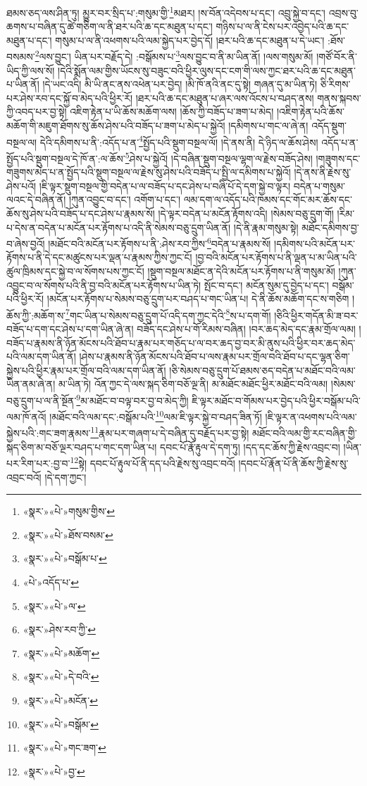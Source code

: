 ཐམས་ཅད་ལས་ཤིན་ཏུ། མྱུར་བར་སྲིད་པ་:གསུམ་གྱི་\footnote{«སྣར་»«པེ་»གསུམ་གྱིས་}མཐར། །ས་བོན་འདེབས་པ་དང་། འབྲུ་སྐྱེ་བ་དང་། འབྲས་བུ་ཆགས་པ་བཞིན་དུ་ཚེ་གཅིག་ལ་ནི་ཐར་པའི་ཆ་དང་མཐུན་པ་དང་། གཉིས་པ་ལ་ནི་ངེས་པར་འབྱེད་པའི་ཆ་དང་མཐུན་པ་དང་། གསུམ་པ་ལ་ནི་འཕགས་པའི་ལམ་སྐྱེད་པར་བྱེད་དོ། །ཐར་པའི་ཆ་དང་མཐུན་པ་དེ་ཡང་། :ཐོས་བསམས་\footnote{«སྣར་»«པེ་»ཐོས་བསམ་}ལས་བྱུང་། ཡིན་པར་བརྗོད་དེ། :བསྒོམས་པ་\footnote{«སྣར་»«པེ་»བསྒོམ་པ་}ལས་བྱུང་བ་ནི་མ་ཡིན་ནོ། །ལས་གསུམ་མོ། །གཙོ་བོར་ནི་ཡིད་ཀྱི་ལས་སོ། །དེའི་སྨོན་ལམ་གྱིས་ཡོངས་སུ་བཟུང་བའི་ཕྱིར་ལུས་དང་ངག་གི་ལས་ཀྱང་ཐར་པའི་ཆ་དང་མཐུན་པ་ཡིན་ནོ། །དེ་ཡང་འདི། མི་ཡི་ནང་ནས་འཕེན་པར་བྱེད། །མི་ཁོ་ནའི་ནང་དུ་སྟེ། གཞན་དུ་མ་ཡིན་ཏེ། ཅི་རིགས་པར་ཤེས་རབ་དང་སྐྱོ་བ་མེད་པའི་ཕྱིར་རོ། །ཐར་པའི་ཆ་དང་མཐུན་པ་ཞར་ལས་འོངས་པ་བཤད་ནས། གནས་སྐབས་ཀྱི་འབད་པར་བྱ་སྟེ། འཇིག་རྟེན་པ་ཡི་ཆོས་མཆོག་ལས། །ཆོས་ཀྱི་བཟོད་པ་ཟག་པ་མེད། །འཇིག་རྟེན་པའི་ཆོས་མཆོག་གི་མཇུག་ཐོགས་སུ་ཆོས་ཤེས་པའི་བཟོད་པ་ཟག་པ་མེད་པ་སྐྱེའོ། །དམིགས་པ་གང་ལ་ཞེ་ན། འདོད་སྡུག་བསྔལ་ལ། དེའི་དམིགས་པ་ནི་:འདོད་པ་ན་\footnote{«པེ་»འདོད་པ་}སྤྱོད་པའི་སྡུག་བསྔལ་ལོ། །དེ་ནས་ནི། དེ་ཉིད་ལ་ཆོས་ཤེས། འདོད་པ་ན་སྤྱོད་པའི་སྡུག་བསྔལ་དེ་ཁོ་ན་:ལ་ཆོས་\footnote{«སྣར་»«པེ་»ལ་}ཤེས་པ་སྐྱེའོ། །དེ་བཞིན་སྡུག་བསྔལ་ལྷག་ལ་རྗེས་བཟོད་ཤེས། །གཟུགས་དང་གཟུགས་མེད་པ་ན་སྤྱོད་པའི་སྡུག་བསྔལ་ལ་རྗེས་སུ་ཤེས་པའི་བཟོད་པ་སྤྱི་ལ་དམིགས་པ་སྐྱེའོ། །དེ་ནས་ནི་རྗེས་སུ་ཤེས་པའོ། །ཇི་ལྟར་སྡུག་བསྔལ་གྱི་བདེན་པ་ལ་བཟོད་པ་དང་ཤེས་པ་བཞི་པོ་དེ་དག་སྐྱེ་བ་ལྟར། བདེན་པ་གསུམ་ལའང་དེ་བཞིན་ནོ། །ཀུན་འབྱུང་བ་དང་། འགོག་པ་དང་། ལམ་དག་ལ་འདོད་པའི་ཁམས་དང་གོང་མར་ཆོས་དང་ཆོས་སུ་ཤེས་པའི་བཟོད་པ་དང་ཤེས་པ་རྣམས་སོ། །དེ་ལྟར་བདེན་པ་མངོན་རྟོགས་འདི། །སེམས་བཅུ་དྲུག་གོ། །རིམ་པ་དེས་ན་བདེན་པ་མངོན་པར་རྟོགས་པ་འདི་ནི་སེམས་བཅུ་དྲུག་ཡིན་ནོ། །དེ་ནི་རྣམ་གསུམ་སྟེ། མཐོང་དམིགས་བྱ་བ་ཞེས་བྱའོ། །མཐོང་བའི་མངོན་པར་རྟོགས་པ་ནི་:ཤེས་རབ་ཀྱིས་\footnote{«སྣར་»ཤེས་རབ་ཀྱི་}བདེན་པ་རྣམས་སོ། །དམིགས་པའི་མངོན་པར་རྟོགས་པ་ནི་དེ་དང་མཚུངས་པར་ལྡན་པ་རྣམས་ཀྱིས་ཀྱང་ངོ། །བྱ་བའི་མངོན་པར་རྟོགས་པ་ནི་ལྡན་པ་མ་ཡིན་པའི་ཚུལ་ཁྲིམས་དང་སྐྱེ་བ་ལ་སོགས་པས་ཀྱང་ངོ། །སྡུག་བསྔལ་མཐོང་ན་དེའི་མངོན་པར་རྟོགས་པ་ནི་གསུམ་མོ། །ཀུན་འབྱུང་བ་ལ་སོགས་པའི་ནི་བྱ་བའི་མངོན་པར་རྟོགས་པ་ཡིན་ཏེ། སྤོང་བ་དང་། མངོན་སུམ་དུ་བྱེད་པ་དང་། བསྒོམ་པའི་ཕྱིར་རོ། །མངོན་པར་རྟོགས་པ་སེམས་བཅུ་དྲུག་པར་བཤད་པ་གང་ཡིན་པ། དེ་ནི་ཆོས་མཆོག་དང་ས་གཅིག །ཆོས་ཀྱི་:མཆོག་ས་\footnote{«སྣར་»«པེ་»མཆོག་}གང་ཡིན་པ་སེམས་བཅུ་དྲུག་པོ་འདི་དག་ཀྱང་དེའི་\footnote{«སྣར་»«པེ་»དེ་བའི་}ས་པ་དག་གོ། །ཅིའི་ཕྱིར་གདོན་མི་ཟ་བར་བཟོད་པ་དག་དང་ཤེས་པ་དག་ཡིན་ཞེ་ན། བཟོད་དང་ཤེས་པ་གོ་རིམས་བཞིན། །བར་ཆད་མེད་དང་རྣམ་གྲོལ་ལམ། །བཟོད་པ་རྣམས་ནི་ཉོན་མོངས་པའི་ཐོབ་པ་རྣམ་པར་གཅོད་པ་ལ་བར་ཆད་བྱ་བར་མི་ནུས་པའི་ཕྱིར་བར་ཆད་མེད་པའི་ལམ་དག་ཡིན་ནོ། །ཤེས་པ་རྣམས་ནི་ཉོན་མོངས་པའི་ཐོབ་པ་ལས་རྣམ་པར་གྲོལ་བའི་ཐོབ་པ་དང་ལྷན་ཅིག་སྐྱེས་པའི་ཕྱིར་རྣམ་པར་གྲོལ་བའི་ལམ་དག་ཡིན་ནོ། །ཅི་སེམས་བཅུ་དྲུག་པོ་ཐམས་ཅད་བདེན་པ་མཐོང་བའི་ལམ་ཡིན་ནམ་ཞེ་ན། མ་ཡིན་ཏེ། འོན་ཀྱང་དེ་ལས་སྐད་ཅིག་བཅོ་ལྔ་ནི། མ་མཐོང་མཐོང་ཕྱིར་མཐོང་བའི་ལམ། །སེམས་བཅུ་དྲུག་པ་ལ་ནི་སྔོན་\footnote{«སྣར་»«པེ་»མངོན་}མ་མཐོང་བ་བལྟ་བར་བྱ་བ་མེད་ཀྱི། ཇི་ལྟར་མཐོང་བ་གོམས་པར་བྱེད་པའི་ཕྱིར་བསྒོམ་པའི་ལམ་ཁོ་ནའོ། །མཐོང་བའི་ལམ་དང་:བསྒོམ་པའི་\footnote{«སྣར་»«པེ་»བསྒོམ་}ལམ་ཇི་ལྟར་སྐྱེ་བ་བཤད་ཟིན་ཏོ། །ཇི་ལྟར་ན་འཕགས་པའི་ལམ་སྐྱེས་པའི་:གང་ཟག་རྣམས་\footnote{«སྣར་»«པེ་»གང་ཟག་}རྣམ་པར་གཞག་པ་དེ་བཞིན་དུ་བརྗོད་པར་བྱ་སྟེ། མཐོང་བའི་ལམ་གྱི་རང་བཞིན་གྱི་སྐད་ཅིག་མ་བཅོ་ལྔར་བཤད་པ་གང་དག་ཡིན་པ། དབང་པོ་རྣོ་རྟུལ་དེ་དག་ཏུ། །དད་དང་ཆོས་ཀྱི་རྗེས་འབྲང་བ། །ཡིན་པར་རིག་པར་:བྱ་བ་\footnote{«སྣར་»«པེ་»བྱ་}སྟེ། དབང་པོ་རྟུལ་པོ་ནི་དད་པའི་རྗེས་སུ་འབྲང་བའོ། །དབང་པོ་རྣོན་པོ་ནི་ཆོས་ཀྱི་རྗེས་སུ་འབྲང་བའོ། །དེ་དག་ཀྱང་། 